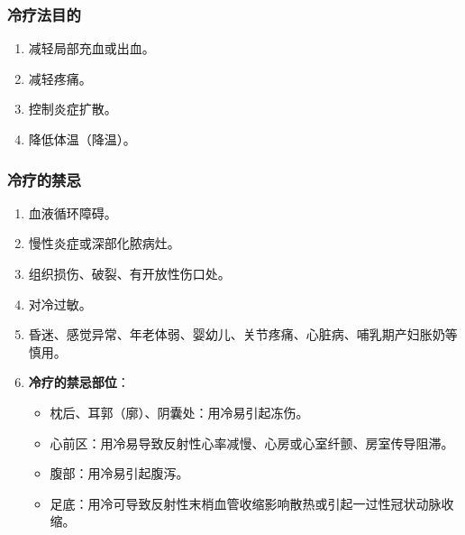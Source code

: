 \documentclass[11pt, a4paper]{ctexart}
\begin{document}
\subsubsection{冷疗法目的}
\begin{enumerate}
    \item 减轻局部充血或出血。
    \item 减轻疼痛。
    \item 控制炎症扩散。
    \item 降低体温（降温）。
\end{enumerate}

\subsubsection{冷疗的禁忌}
\begin{enumerate}
    \item 血液循环障碍。
    \item 慢性炎症或深部化脓病灶。
    \item 组织损伤、破裂、有开放性伤口处。
    \item 对冷过敏。
    \item 昏迷、感觉异常、年老体弱、婴幼儿、关节疼痛、心脏病、哺乳期产妇胀奶等慎用。
    \item \textbf{冷疗的禁忌部位}：
    \begin{itemize}
        \item 枕后、耳郭（廓）、阴囊处：用冷易引起冻伤。
        \item 心前区：用冷易导致反射性心率减慢、心房或心室纤颤、房室传导阻滞。
        \item 腹部：用冷易引起腹泻。
        \item 足底：用冷可导致反射性末梢血管收缩影响散热或引起一过性冠状动脉收缩。
    \end{itemize}
\end{enumerate}
\end{document}
